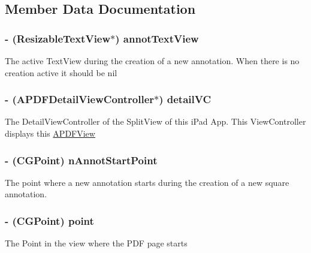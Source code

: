 \subsection{Member Data Documentation}
\hypertarget{interface_a_p_d_f_view_adba82d308f7f6629000643b288127725}{
\subsubsection[{annot\-Text\-View}]{\setlength{\rightskip}{0pt plus 5cm}-\/ ({\bf Resizable\-Text\-View}$\ast$) annot\-Text\-View\hspace{0.3cm}{\ttfamily [protected]}}}\label{interface_a_p_d_f_view_adba82d308f7f6629000643b288127725}
The active Text\-View during the creation of a new annotation. When there is no creation active it should be nil \hypertarget{interface_a_p_d_f_view_ad613f45976958c923fad11d2a37f3e2e}{
\subsubsection[{detail\-V\-C}]{\setlength{\rightskip}{0pt plus 5cm}-\/ ({\bf A\-P\-D\-F\-Detail\-View\-Controller}$\ast$) detail\-V\-C\hspace{0.3cm}{\ttfamily [protected]}}}\label{interface_a_p_d_f_view_ad613f45976958c923fad11d2a37f3e2e}
The Detail\-View\-Controller of the Split\-View of this i\-Pad App. This View\-Controller displays this \hyperlink{interface_a_p_d_f_view}{A\-P\-D\-F\-View} \hypertarget{interface_a_p_d_f_view_aa1a5d0930fcd5aeebcbcead8fdf9ce6f}{
\subsubsection[{n\-Annot\-Start\-Point}]{\setlength{\rightskip}{0pt plus 5cm}-\/ (C\-G\-Point) n\-Annot\-Start\-Point\hspace{0.3cm}{\ttfamily [protected]}}}\label{interface_a_p_d_f_view_aa1a5d0930fcd5aeebcbcead8fdf9ce6f}
The point where a new annotation starts during the creation of a new square annotation. \hypertarget{interface_a_p_d_f_view_afb6689ca57c46c09d6a37a7c60ae5f52}{
\subsubsection[{point}]{\setlength{\rightskip}{0pt plus 5cm}-\/ (C\-G\-Point) point\hspace{0.3cm}{\ttfamily [protected]}}}\label{interface_a_p_d_f_view_afb6689ca57c46c09d6a37a7c60ae5f52}
The Point in the view where the P\-D\-F page starts 

